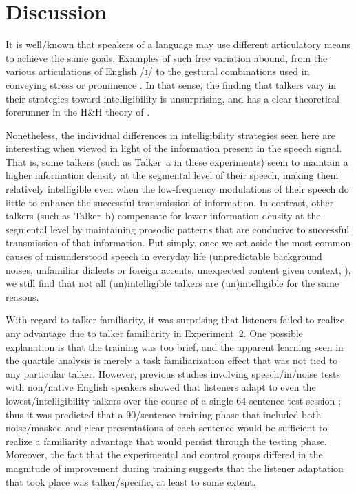 \chapter{Discussion\label{chap:Discussion}}

It is well\-/known that speakers of a language may use different articulatory means to achieve the same goals.  Examples of such free variation abound, from the various articulations of English /ɹ/ \citep{Hagiwara1995, CampbellEtAl2010} to the gestural combinations used in conveying stress or prominence \citep{deJong1995}.  In that sense, the finding that talkers vary in their strategies toward intelligibility is unsurprising, and has a clear theoretical forerunner in the H\&H theory of \citet{Lindblom1990}.

Nonetheless, the individual differences in intelligibility strategies seen here are interesting when viewed in light of the information present in the speech signal.  That is, some talkers (such as Talker~\ac{a} in these experiments) seem to maintain a higher information density at the segmental level of their speech, making them relatively intelligible even when the low-frequency modulations of their speech do little to enhance the successful transmission of information.  In contrast, other talkers (such as Talker~\ac{b}) compensate for lower information density at the segmental level by maintaining prosodic patterns that are conducive to successful transmission of that information.  Put simply, once we set aside the most common causes of misunderstood speech in everyday life (unpredictable background noises, unfamiliar dialects or foreign accents, unexpected content given context, \etc), we still find that not all (un)intelligible talkers are (un)intelligible for the same reasons.

With regard to talker familiarity, it was surprising that listeners failed to realize any advantage due to talker familiarity in Experiment~2.  One possible explanation is that the training was too brief, and the apparent learning seen in the quartile analysis is merely a task familiarization effect that was not tied to any particular talker.  However, previous studies involving speech\-/in\-/noise tests with non\-/native English speakers showed that listeners adapt to even the lowest\-/intelligibility talkers over the course of a single 64-sentence test session \citep{BradlowBent2008}; thus it was predicted that a 90\-/sentence training phase that included both noise\-/masked and clear presentations of each sentence would be sufficient to realize a familiarity advantage that would persist through the testing phase.  Moreover, the fact that the experimental and control groups differed in the magnitude of improvement during training suggests that the listener adaptation that took place was talker\-/specific, at least to some extent.  

